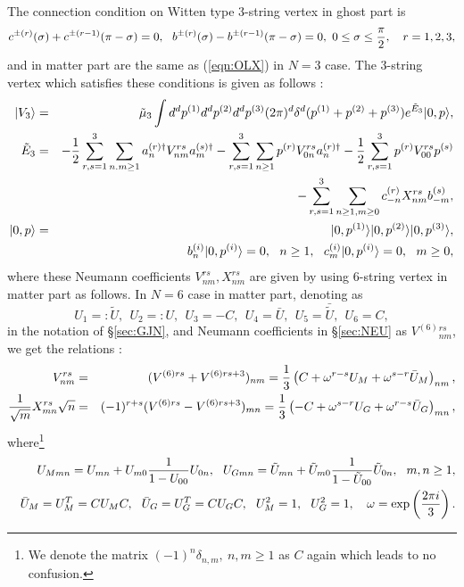 \documentclass[12pt,a4paper]{article}
\begin{document}
The connection condition on Witten type 3-string vertex in ghost part is
\begin{equation}
c^{\pm(r)}(\sigma)+c^{\pm(r-1)}(\pi-\sigma)=0,\ \ b^{\pm(r)}(\sigma)-b^{\pm(r-1)}(\pi-\sigma)=0,\ 0\leq\sigma\leq{\pi\over2},\ \ \ r=1,2,3,
\end{equation}
and in matter part are the same as (\ref{eqn:OLX}) in $N=3$ case.
The 3-string vertex which satisfies these conditions is given as follows \cite{IOS}:
\begin{eqnarray}
\label{eqn:3SV}
|V_3\rangle&=&{\tilde \mu}_3 \int d^dp^{(1)}d^dp^{(2)}d^dp^{(3)} (2\pi)^d\delta^d(p^{(1)}+p^{(2)}+p^{(3)})e^{{\tilde E}_3}|0,p\rangle,\nonumber\\
{\tilde E}_3&=&-{1\over2}\sum_{r,s=1}^3 \sum_{n.m\geq1}a^{(r)\dagger}_nV^{rs}_{nm}a^{(s)\dagger}_m-\sum_{r,s=1}^3 \sum_{n\geq1}p^{(r)}V^{rs}_{0n}a_n^{(r)\dagger}-{1\over2}\sum_{r,s=1}^3p^{(r)}V^{rs}_{00}p^{(s)}\nonumber \\
&&-\sum_{r,s=1}^3 \sum_{n\geq1,m\geq0}c_{-n}^{(r)}X^{rs}_{nm}b_{-m}^{(s)},\nonumber \\
|0,p\rangle&=&|0,p^{(1)}\rangle|0,p^{(2)}\rangle|0,p^{(3)}\rangle,\nonumber \\
&&b^{(i)}_n|0,p^{(i)}\rangle=0,\ \ n\geq1, \ \ c^{(i)}_m|0,p^{(i)}\rangle=0,\ \ m\geq0,
\end{eqnarray}
where these Neumann coefficients $V^{rs}_{nm},X^{rs}_{nm}$ are given by using 6-string vertex in matter part as follows.
In $N=6$ case in matter part, denoting as
\begin{equation}
U_1=:{\tilde U},\ \ U_2=:U,\ \ U_3=-C,\ \ U_4={\bar U},\ \ U_5={\bar {\tilde U}},\ \ U_6=C,
\end{equation}
in the notation of \S \ref{sec:GJN}, and Neumann coefficients in \S \ref{sec:NEU} as $V^{(6)}{}^{rs}_{nm}$, we get the relations :
\begin{eqnarray}
\label{eqn:VX3}
V_{nm}^{rs}&=&(V^{(6)rs}+V^{(6)rs+3})_{nm}={1\over3}\left(C+\omega^{r-s}U_M+\omega^{s-r}{\bar U}_M\right)_{nm},\nonumber\\
{1\over\sqrt m}X^{rs}_{mn}\sqrt n&=&(-1)^{r+s}(V^{(6)rs}-V^{(6)rs+3})_{mn}={1\over3}\left(-C+\omega^{s-r}U_G+\omega^{r-s}{\bar U}_G\right)_{mn},
\end{eqnarray}
where\footnote{
We denote the matrix $(-1)^n\delta_{n,m},\ n,m\geq1$ as $C$ again which leads to no confusion.
}
\begin{eqnarray}
&&U_{Mmn}=U_{mn}+U_{m0}{1\over1-U_{00}}U_{0n},\ \ U_{Gmn}={\tilde U}_{mn}+{\tilde U}_{m0}{1\over1-{\tilde U}_{00}}{\tilde U}_{0n},\ \ m,n\geq1, \nonumber\\
&&{\bar U}_M=U_M^T=CU_MC,\ \ {\bar U}_G=U_G^T=CU_GC,\ \ U_M^2=1,\ \ U_G^2=1,\  \ \ \omega=\exp\left({2\pi i\over3}\right).
\end{eqnarray}
\end{document}

